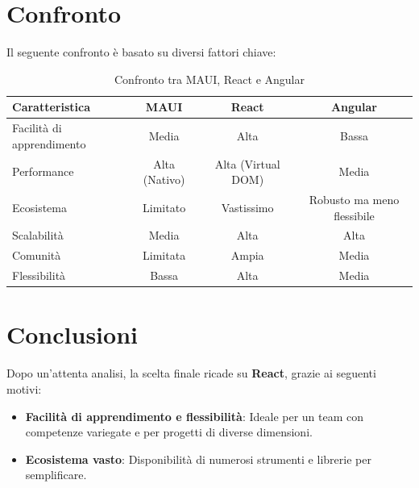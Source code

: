 \documentclass{article}
\begin{document}
\section{Confronto}
Il seguente confronto \`e basato su diversi fattori chiave:

\begin{table}[H]
    \centering
    \begin{tabular}{|l|c|c|c|}
        \hline
        \textbf{Caratteristica} & \textbf{MAUI} & \textbf{React} & \textbf{Angular} \\
        \hline
        Facilità di apprendimento & Media & Alta & Bassa \\
        \hline
        Performance & Alta (Nativo) & Alta (Virtual DOM) & Media \\
        \hline
        Ecosistema & Limitato & Vastissimo & Robusto ma meno flessibile \\
        \hline
        Scalabilità & Media & Alta & Alta \\
        \hline
        Comunità & Limitata & Ampia & Media \\
        \hline
        Flessibilità & Bassa & Alta & Media \\
        \hline
    \end{tabular}
    \caption{Confronto tra MAUI, React e Angular}
    \label{tab:confronto_framework}
\end{table}

\section{Conclusioni}
Dopo un'attenta analisi, la scelta finale ricade su \textbf{React}, grazie ai seguenti motivi:

\begin{itemize}
    \item \textbf{Facilit\`a di apprendimento e flessibilit\`a}: Ideale per un team con competenze variegate e per progetti di diverse dimensioni.
    \item \textbf{Ecosistema vasto}: Disponibilit\`a di numerosi strumenti e librerie per semplificare.
\end{itemize}
\end{document}
